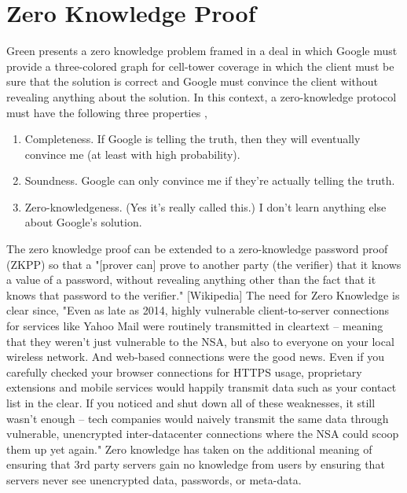 \documentclass[10pt]{article}
\begin{document}
\section*{Zero Knowledge Proof}
Green presents a zero knowledge problem framed in a deal in which Google must provide a three-colored graph for cell-tower coverage in which the client must be sure that the solution is correct and Google must convince the client without revealing anything about the solution. \cite{zeroknow} In this context, a zero-knowledge protocol must have the following three properties \cite{zeroknow},
\begin{enumerate}
    \item Completeness. If Google is telling the truth, then they will eventually convince me (at least with high probability).
    \item Soundness. Google can only convince me if they're actually telling the truth. 
    \item Zero-knowledgeness. (Yes it's really called this.) I don't learn anything else about Google's solution.
\end{enumerate}
The zero knowledge proof can be extended to a zero-knowledge password proof (ZKPP) so that a "[prover can] prove to another party (the verifier) that it knows a value of a password, without revealing anything other than the fact that it knows that password to the verifier." [Wikipedia]  The need for Zero Knowledge is clear since, "Even as late as 2014, highly vulnerable client-to-server connections for services like Yahoo Mail were routinely transmitted in cleartext -- meaning that they weren't just vulnerable to the NSA, but also to everyone on your local wireless network. And web-based connections were the good news. Even if you carefully checked your browser connections for HTTPS usage, proprietary extensions and mobile services would happily transmit data such as your contact list in the clear. If you noticed and shut down all of these weaknesses, it still wasn't enough -- tech companies would naively transmit the same data through vulnerable, unencrypted inter-datacenter connections where the NSA could scoop them up yet again." \cite{networkhostile}  Zero knowledge has taken on the additional meaning of ensuring that 3rd party servers gain no knowledge from users by ensuring that servers never see unencrypted data, passwords, or meta-data.
\end{document}
